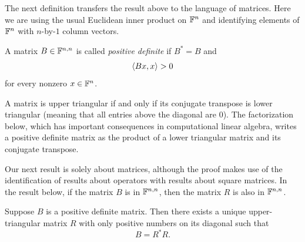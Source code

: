 The next definition transfers the result above to the language of matrices.
Here we are using the usual Euclidean inner product on $\mathbb{F}^n$ and identifying
elements of $\mathbb{F}^n$ with $n$-by-$1$ column vectors.

\begin{definition}\label{ax:7.62}
A matrix $B\in\mathbb{F}^{n,n}$ is called \emph{positive definite} if $B^*=B$ and
\[ \langle Bx, x \rangle>0 \]
for every nonzero $x\in\mathbb{F}^n$.
\end{definition}

A matrix is upper triangular if and only if its conjugate transpose is lower
triangular (meaning that all entries above the diagonal are $0$). The
factorization below, which has important consequences in computational linear
algebra, writes a positive definite matrix as the product of a lower triangular
matrix and its conjugate transpose.

Our next result is solely about matrices, although the proof makes use of the
identification of results about operators with results about square matrices.
In the result below, if the matrix $B$ is in $\mathbb{F}^{n,n}$, then the matrix $R$ is
also in $\mathbb{F}^{n,n}$.

\begin{result}\label{ax:7.63}
Suppose $B$ is a positive definite matrix. Then there exists a unique
upper-triangular matrix $R$ with only positive numbers on its diagonal such that
\[ B=R^*R. \]
\end{result}

